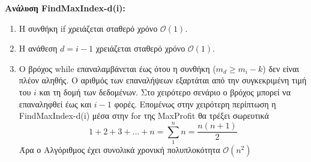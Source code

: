 \documentclass[a4paper,11pt]{article}
\begin{document}
\textbf{Ανάλυση FindMaxIndex-d(i):}
\begin{enumerate}
\item Η συνθήκη if χρειάζεται σταθερό χρόνο $\mathcal{O}(1)$.
\item Η ανάθεση $d = i-1$ χρειάζεται σταθερό χρόνο $\mathcal{O}(1)$.
\item Ο βρόχος while επαναλαμβάνεται έως ότου η συνθήκη ($m_{d} \geq m_{i}-k$) δεν είναι πλέον αληθής. Ο αριθμός των επαναλήψεων εξαρτάται από την συγκεκριμένη τιμή του $i$ και τη δομή των δεδομένων. Στο χειρότερο σενάριο ο βρόχος μπορεί να επαναληφθεί έως και $i-1$ φορές. Επομένως στην χειρότερη περίπτωση η FindMaxIndex-d(i) μέσα στην for της MaxProfit θα τρέξει σωρευτικά $$1 + 2 + 3 + ... + n = \sum_{1} ^{n} n = \frac{n(n+1)}{2} $$
Άρα ο Αλγόριθμος έχει συνολικά χρονική πολυπλοκότητα $\mathcal{O}(n^2)$
\end{enumerate}
\end{document}
